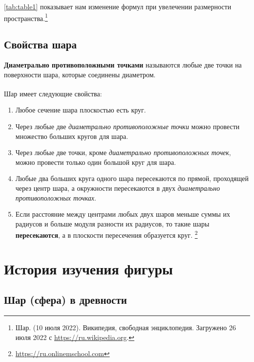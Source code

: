 \documentclass[14pt,a4paper]{report}
\begin{document}
 \ref{tab:table1} показывает нам изменение формул при увелечении размерности пространства.\footnote[1]{Шар. (10 июля 2022). Википедия, свободная энциклопедия. Загружено 26 июля 2022 с \href{https://ru.wikipedia.org/?curid=767231\&oldid=123936290}{https://ru.wikipedia.org}.}

\section[Свойства]{Свойства шара}

\textbf{Диаметрально противоположными точками} называются любые две точки на поверхности шара, которые соединены диаметром. \\\\
Шар имеет следующие свойства:

\begin{enumerate}  
	\item Любое сечение шара плоскостью есть круг. 
	\item Через любые две \textit{диаметрально противоположные точки} можно провести множество больших кругов для шара.
	\item Через любые две точки, кроме \textit{диаметрально противоположных точек}, можно провести только один большой круг для шара.
	\item Любые два больших круга одного шара пересекаются по прямой, проходящей через центр шара, а окружности пересекаются в двух \textit{диаметрально противоположных точках}.
	\item Если расстояние между центрами любых двух шаров меньше суммы их радиусов и больше модуля разности их радиусов, то такие шары \textbf{пересекаются}, а в плоскости пересечения образуется круг. \footnote[7]{\href{https://ru.onlinemschool.com/math/formula/sphere/}{https://ru.onlinemschool.com}}
\end{enumerate}

\newpage


\chapter{История изучения фигуры}

\section[История шара (сферы)]{Шар (сфера) в древности}
\end{document}
